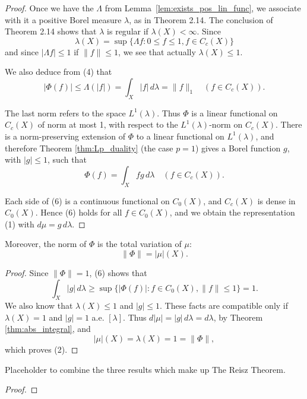 \begin{proof}
  Once we have the $\Lambda$ from Lemma~\ref{lem:exists_pos_lin_func}, we associate with it a positive Borel measure $\lambda$, as in Theorem 2.14.
  The conclusion of Theorem 2.14 shows that $\lambda$ is regular if $\lambda(X) < \infty$.
  Since
  \begin{equation}
    \lambda(X) = \sup \{\Lambda f : 0 \leq f \leq 1, f \in C_c(X)\}
  \end{equation}
  and since $|\Lambda f| \leq 1$ if $\|f\| \leq 1$, we see that actually $\lambda(X) \leq 1$.

  We also deduce from (4) that
  \begin{equation}
    |\Phi(f)| \leq \Lambda(|f|) = \int_X |f| \, d\lambda = \|f\|_1 \quad (f \in C_c(X)). \tag{5}
  \end{equation}

  The last norm refers to the space $L^1(\lambda)$.
  Thus $\Phi$ is a linear functional on $C_c(X)$ of norm at most 1, with respect to the $L^1(\lambda)$-norm on $C_c(X)$.
  There is a norm-preserving extension of $\Phi$ to a linear functional on $L^1(\lambda)$, and therefore Theorem \ref{thm:Lp_duality} (the case $p = 1$) gives a Borel function $g$, with $|g| \leq 1$, such that
  \begin{equation}
    \Phi(f) = \int_X fg \, d\lambda \quad (f \in C_c(X)). \tag{6}
  \end{equation}

  Each side of (6) is a continuous functional on $C_0(X)$, and $C_c(X)$ is dense in $C_0(X)$.
  Hence (6) holds for all $f \in C_0(X)$, and we obtain the representation (1) with $d\mu = g \, d\lambda$.
\end{proof}

\begin{lemma}[Rudin 6.19]
  \label{lem:norm_eq_variation}
  Moreover, the norm of $\Phi$ is the total variation of $\mu$:
  \begin{equation}
    \|\Phi\| = |\mu|(X). \tag{2}
  \end{equation}
\end{lemma}

\begin{proof}
  Since $\|\Phi\| = 1$, (6) shows that
  \begin{equation}
    \int_X |g| \, d\lambda \geq \sup \{|\Phi(f)| : f \in C_0(X), \|f\| \leq 1\} = 1. \tag{7}
  \end{equation}
  We also know that $\lambda(X) \leq 1$ and $|g| \leq 1$.
  These facts are compatible only if $\lambda(X) = 1$ and $|g| = 1$ a.e. $[\lambda]$.
  Thus $d|\mu| = |g| \, d\lambda = d\lambda$, by Theorem \ref{thm:abs_integral}, and
  \begin{equation}
    |\mu|(X) = \lambda(X) = 1 = \|\Phi\|, \tag{8}
  \end{equation}
  which proves (2).
\end{proof}

\begin{theorem}
  \label{thm:ComplexRMK}
  Placeholder to combine the three results which make up The Reisz Theorem.
\end{theorem}
\begin{proof}
\end{proof}
